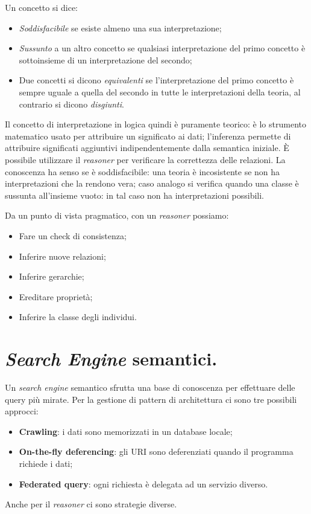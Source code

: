 \documentclass[11pt]{article}
\begin{document}
Un concetto si dice:
\begin{itemize}
\item \textit{Soddisfacibile} se esiste almeno una sua interpretazione; 
\item \textit{Sussunto} a un altro concetto se qualsiasi interpretazione del primo concetto è sottoinsieme di un interpretazione del secondo;
\item Due concetti si dicono \textit{equivalenti} se l'interpretazione del primo concetto è sempre uguale a quella del secondo in tutte le interpretazioni della teoria, al contrario si dicono \textit{disgiunti}.
\end{itemize}
Il concetto di interpretazione in logica quindi è puramente teorico: è lo strumento matematico usato per attribuire un significato ai dati; l'inferenza permette di attribuire significati aggiuntivi indipendentemente dalla semantica iniziale.
È possibile utilizzare il \textit{reasoner} per verificare la correttezza delle relazioni.
La conoscenza ha senso se è soddisfacibile: una teoria è incosistente se non ha interpretazioni che la rendono vera; caso analogo si verifica quando una classe è sussunta all'insieme vuoto: in tal caso non ha interpretazioni possibili.

Da un punto di vista pragmatico, con un \textit{reasoner} possiamo:
\begin{itemize}
\item Fare un check di consistenza;
\item Inferire nuove relazioni;
\item Inferire gerarchie;
\item Ereditare proprietà;
\item Inferire la classe degli individui.
\end{itemize}

\section{\textit{Search Engine} semantici.}
Un \textit{search engine} semantico sfrutta una base di conoscenza per effettuare delle query più mirate.
Per la gestione di pattern di architettura ci sono tre possibili approcci:
\begin{itemize}
\item \textbf{Crawling}: i dati sono memorizzati in un database locale;
\item \textbf{On-the-fly deferencing}: gli URI sono deferenziati quando il programma richiede i dati;
\item \textbf{Federated query}: ogni richiesta è delegata ad un servizio diverso.
\end{itemize}
Anche per il \textit{reasoner} ci sono strategie diverse.
\end{document}
